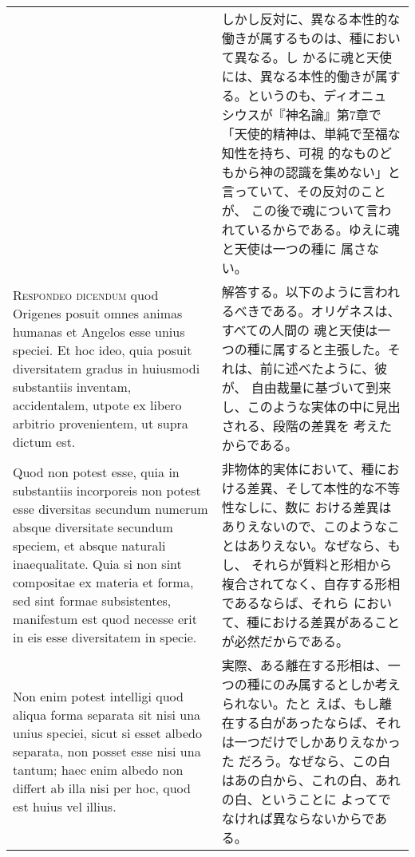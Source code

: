 \documentclass[paper=a4paper,fontsize=10pt,jafontsize=9pt,titlepage]{jlreq}
\begin{document}
\begin{longtable}{p{21em}p{21em}}
&

 しかし反対に、異なる本性的な働きが属するものは、種において異なる。し
 かるに魂と天使には、異なる本性的働きが属する。というのも、ディオニュ
 シウスが『神名論』第7章で「天使的精神は、単純で至福な知性を持ち、可視
 的なものどもから神の認識を集めない」と言っていて、その反対のことが、
 この後で魂について言われているからである。ゆえに魂と天使は一つの種に
 属さない。
 
\\



{\scshape Respondeo dicendum} quod Origenes posuit omnes animas
 humanas et Angelos esse unius speciei. Et hoc ideo, quia posuit
 diversitatem gradus in huiusmodi substantiis inventam, accidentalem,
 utpote ex libero arbitrio provenientem, ut supra dictum est.

&

解答する。以下のように言われるべきである。オリゲネスは、すべての人間の
魂と天使は一つの種に属すると主張した。それは、前に述べたように、彼が、
自由裁量に基づいて到来し、このような実体の中に見出される、段階の差異を
考えたからである。

 
\\


Quod non potest esse, quia in substantiis incorporeis non potest esse
diversitas secundum numerum absque diversitate secundum speciem, et
absque naturali inaequalitate. Quia si non sint compositae ex materia
et forma, sed sint formae subsistentes, manifestum est quod necesse
erit in eis esse diversitatem in specie.

&

非物体的実体において、種における差異、そして本性的な不等性なしに、数に
おける差異はありえないので、このようなことはありえない。なぜなら、もし、
それらが質料と形相から複合されてなく、自存する形相であるならば、それら
において、種における差異があることが必然だからである。
 
\\


Non enim potest intelligi quod aliqua forma separata sit nisi una
unius speciei, sicut si esset albedo separata, non posset esse nisi
una tantum; haec enim albedo non differt ab illa nisi per hoc, quod
est huius vel illius.

&

実際、ある離在する形相は、一つの種にのみ属するとしか考えられない。たと
えば、もし離在する白があったならば、それは一つだけでしかありえなかった
だろう。なぜなら、この白はあの白から、これの白、あれの白、ということに
よってでなければ異ならないからである。
 

\end{longtable}
\end{document}
